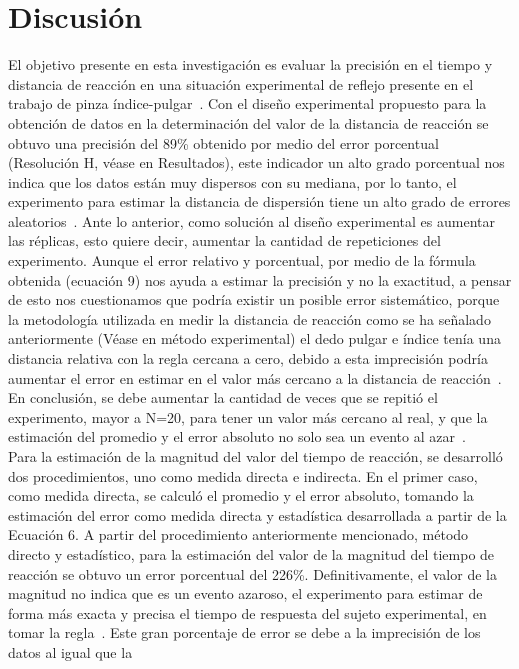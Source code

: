 \documentclass[runningheads]{llncs}
\begin{document}
    \section{Discusión}
    El objetivo presente en esta investigación es evaluar la precisión en el tiempo y distancia de reacción en una situación experimental de reflejo presente en el trabajo de pinza índice-pulgar~\cite{gomez2015desarrollo}. 
    Con el diseño experimental propuesto para la obtención de datos en la determinación del valor de la distancia de reacción se obtuvo una precisión del 89\% 
    obtenido por medio del error porcentual (Resolución H, véase en Resultados), este indicador un alto grado porcentual nos indica que los datos están muy dispersos con su mediana, por lo tanto, el experimento para estimar la distancia de dispersión tiene un alto grado de errores aleatorios~\cite{Ratinoff}. 
    Ante lo anterior, como solución al diseño experimental es aumentar las réplicas, esto quiere decir, aumentar la cantidad de repeticiones del experimento. Aunque el error relativo y porcentual, por medio de la fórmula obtenida (ecuación 9) 
    nos ayuda a estimar la precisión y no la exactitud, a pensar de esto nos cuestionamos que podría existir un posible error sistemático, porque la metodología utilizada en medir la distancia de reacción como se ha señalado anteriormente 
    (Véase en método experimental) el dedo pulgar e índice tenía una distancia relativa con la regla cercana a cero, debido a esta imprecisión podría aumentar el error en estimar en el valor más cercano a la distancia de reacción~\cite{Ratinoff}. 
    En conclusión, se debe aumentar la cantidad de veces que se repitió el experimento, mayor a N=20, para tener un valor más cercano al real, y que la estimación del promedio y el error absoluto no solo sea un evento al azar~\cite{quezada2007potencia}.\\ 
    \linebreak
    Para la estimación de la magnitud del valor del tiempo de reacción, se desarrolló dos procedimientos, uno como medida directa e indirecta. En el primer caso, como medida directa, se calculó el promedio y el error absoluto, 
    tomando la estimación del error como medida directa y estadística desarrollada a partir de la Ecuación 6. A partir del procedimiento anteriormente mencionado, método directo y estadístico, para la estimación del valor de la magnitud del tiempo de reacción se obtuvo un error porcentual del 226\%. 
    Definitivamente, el valor de la magnitud no indica que es un evento azaroso, el experimento para estimar de forma más exacta y precisa el tiempo de respuesta del sujeto experimental, en tomar la regla~\cite{quezada2007potencia}. Este gran porcentaje de error se debe a la imprecisión de los datos al igual que la 
\end{document}

